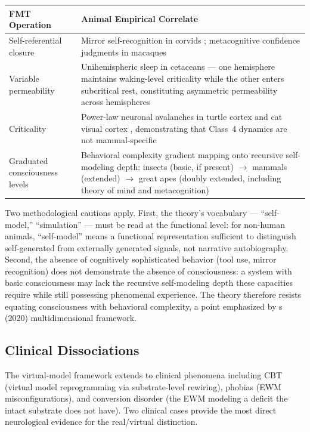 \documentclass[12pt]{article}
\begin{document}
\begin{table}[H]
\centering
\small
\begin{tabularx}{\textwidth}{lX}
\toprule
\textbf{FMT Operation} & \textbf{Animal Empirical Correlate} \\
\midrule
Self-referential closure & Mirror self-recognition in corvids \citep{Prior2008}; metacognitive confidence judgments in macaques \citep{Hampton2001} \\
Variable permeability & Unihemispheric sleep in cetaceans --- one hemisphere maintains waking-level criticality while the other enters subcritical rest, constituting asymmetric permeability across hemispheres \citep{Mukhametov1977} \\
Criticality & Power-law neuronal avalanches in turtle cortex \citep{Shew2009} and cat visual cortex \citep{Beggs2003}, demonstrating that Class~4 dynamics are not mammal-specific \\
Graduated consciousness levels & Behavioral complexity gradient mapping onto recursive self-modeling depth: insects (basic, if present) $\rightarrow$ mammals (extended) $\rightarrow$ great apes (doubly extended, including theory of mind and metacognition) \\
\bottomrule
\end{tabularx}
\end{table}

Two methodological cautions apply. First, the theory's vocabulary --- ``self-model,'' ``simulation'' --- must be read at the functional level: for non-human animals, ``self-model'' means a functional representation sufficient to distinguish self-generated from externally generated signals, not narrative autobiography. Second, the absence of cognitively sophisticated behavior (tool use, mirror recognition) does not demonstrate the absence of consciousness: a system with basic consciousness may lack the recursive self-modeling depth these capacities require while still possessing phenomenal experience. The theory therefore resists equating consciousness with behavioral complexity, a point emphasized by \citeauthor{BirchSchnellClayton2020}\textquotesingle s (2020) multidimensional framework.


\subsection{Clinical Dissociations}


The virtual-model framework extends to clinical phenomena including CBT (virtual model reprogramming via substrate-level rewiring), phobias (EWM misconfigurations), and conversion disorder (the EWM modeling a deficit the intact substrate does not have). Two clinical cases provide the most direct neurological evidence for the real/virtual distinction.
\end{document}
